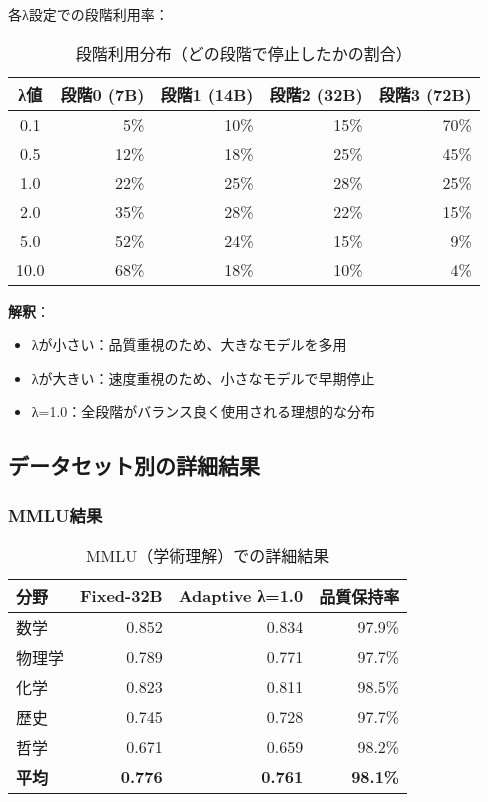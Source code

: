 \documentclass[a4paper,12pt]{jsarticle}
\begin{document}
各λ設定での段階利用率：

\begin{table}[H]
\centering
\caption{段階利用分布（どの段階で停止したかの割合）}
\begin{tabular}{|c|r|r|r|r|}
\hline
\textbf{λ値} & \textbf{段階0 (7B)} & \textbf{段階1 (14B)} & \textbf{段階2 (32B)} & \textbf{段階3 (72B)} \\
\hline
0.1 & 5\% & 10\% & 15\% & 70\% \\
0.5 & 12\% & 18\% & 25\% & 45\% \\
1.0 & 22\% & 25\% & 28\% & 25\% \\
2.0 & 35\% & 28\% & 22\% & 15\% \\
5.0 & 52\% & 24\% & 15\% & 9\% \\
10.0 & 68\% & 18\% & 10\% & 4\% \\
\hline
\end{tabular}
\end{table}

\textbf{解釈}：
\begin{itemize}
\item λが小さい：品質重視のため、大きなモデルを多用
\item λが大きい：速度重視のため、小さなモデルで早期停止
\item λ=1.0：全段階がバランス良く使用される理想的な分布
\end{itemize}

\subsection{データセット別の詳細結果}

\subsubsection{MMLU結果}

\begin{table}[H]
\centering
\caption{MMLU（学術理解）での詳細結果}
\begin{tabular}{|l|r|r|r|}
\hline
\textbf{分野} & \textbf{Fixed-32B} & \textbf{Adaptive λ=1.0} & \textbf{品質保持率} \\
\hline
数学 & 0.852 & 0.834 & 97.9\% \\
物理学 & 0.789 & 0.771 & 97.7\% \\
化学 & 0.823 & 0.811 & 98.5\% \\
歴史 & 0.745 & 0.728 & 97.7\% \\
哲学 & 0.671 & 0.659 & 98.2\% \\
\hline
\textbf{平均} & \textbf{0.776} & \textbf{0.761} & \textbf{98.1\%} \\
\hline
\end{tabular}
\end{table}
\end{document}
